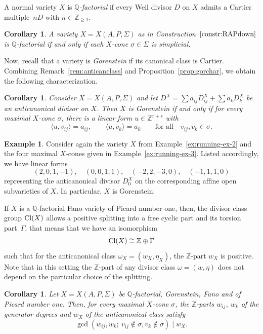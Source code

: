 \documentclass[10pt,a4paper]{amsart}
\newtheorem{coro}[thm]{Corollary}
\theoremstyle{definition}
\newtheorem{exam}[thm]{Example}
\def\Cl{{\rm Cl}}
\def\ZZ{{\mathbb Z}}
\def\QQ{{\mathbb Q}}
\def\bangle#1{{\langle #1 \rangle}}
\numberwithin{equation}{section}
\begin{document}
A normal variety $X$ is \emph{$\QQ$-factorial} if every
Weil divisor $D$ on $X$ admits a Cartier
multiple~$nD$ with $n \in \ZZ_{\ge 1}$.

\begin{coro}
A variety $X = X(A,P,\Sigma)$ as in
Construction~$\ref{constr:RAPdown}$
is $\QQ$-factorial if and only if
each $X$-cone $\sigma \in \Sigma$
is simplicial.
\end{coro}

Now, recall that a variety is \emph{Gorenstein} if its
canonical class is Cartier.
Combining Remark~\ref{rem:anticanclass} and
Proposition~\ref{prop:gorchar}, we obtain the
following characterization.

\begin{coro}
\label{cor:gor2div}
Consider $X = X(A,P,\Sigma)$ and let
$D^X = \sum a_{ij} D^X_{ij} + \sum a_k D^X_k$
be an anticanonical divisor on $X$.
Then $X$ is Gorenstein if and
only if for every maximal $X$-cone
$\sigma$, there is a linear form $u \in \ZZ^{r+s}$
with
\[
\bangle{u,v_{ij}} = a_{ij},\qquad
\bangle{u,v_k} = a_k\qquad
\text{for all}\quad v_{ij}, v_k \in \sigma.
\]
\end{coro}


\begin{exam}
\label{ex:running-ex-4}
Consider again the variety $X$
from Example~\ref{ex:running-ex-2}
and the four maximal $X$-cones
given in Example~\ref{ex:running-ex-3}.
Listed accordingly, we have linear forms
\[
(2,0,1,-1),
\quad
(0,0,1,1),
\quad
(-2,2,-3,0),
\quad
(-1,1,1,0)
\]
representing the anticanonical divisor $D^X_0$
on the corresponding affine open subvarieties of $X$.
In particular, $X$ is Gorenstein.
\end{exam}


If $X$ is a $\QQ$-factorial Fano variety of Picard
number one, then, the divisor class group $\Cl(X)$
allows a positive splitting into a free cyclic part and its
torsion part~$\Gamma$, that means that we have
an isomorphism
\[
\Cl(X) \cong \ZZ \oplus \Gamma
\]
such that for the anticanonical class
$\omega_X = (w_X,\eta_X)$, the $\ZZ$-part
$w_X$ is positive.
Note that in this setting the $\ZZ$-part
of any divisor class $\omega = (w,\eta)$
does not depend on the particular choice of the
splitting.


\begin{coro}
\label{prop:gor2div2}
Let $X = X(A,P,\Sigma)$ be $\QQ$-factorial, Gorenstein, Fano
and of Picard number one.
Then, for every maximal $X$-cone $\sigma$,
the $\ZZ$-parts $w_{ij}$, $w_k$ of the generator degrees
and $w_X$ of the anticanonical class satisfy
\[
\gcd(w_{ij},w_k; \ v_{ij} \not\in \sigma, v_k \not\in \sigma)
\mid
w_X.
\]
\end{coro}
\end{document}
